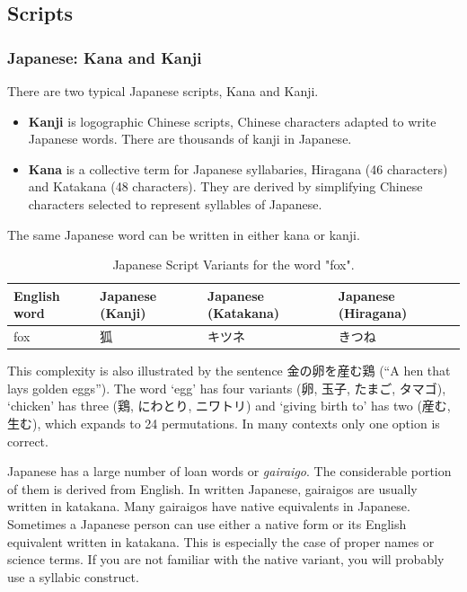 \documentclass[11pt]{article}
\begin{document}
\subsection{Scripts}
\subsubsection{Japanese: Kana and Kanji}
There are two typical Japanese scripts, Kana and Kanji.
\begin{itemize}
    \item \textbf{Kanji} is logographic Chinese scripts, Chinese characters adapted to write Japanese words. There are thousands of kanji in Japanese.
    \item \textbf{Kana} is a collective term for Japanese syllabaries, Hiragana (46 characters) and Katakana (48 characters). They are derived by simplifying Chinese characters selected to represent syllables of Japanese.
\end{itemize}

The same Japanese word can be written in either kana or kanji.

\begin{table}[h!]
    \centering
    \caption{Japanese Script Variants for the word "fox".}
    \begin{tabular}{llll}
    \toprule
    \textbf{English word} & \textbf{Japanese (Kanji)} & \textbf{Japanese (Katakana)} & \textbf{Japanese (Hiragana)} \\
    \midrule
    fox & 狐 & キツネ & きつね \\
    \bottomrule
    \end{tabular}
    \label{tab:fox_variants}
\end{table}

This complexity is also illustrated by the sentence 金の卵を産む鶏 (“A hen that lays golden eggs”). The word ‘egg’ has four variants (卵, 玉子, たまご, タマゴ), ‘chicken’ has three (鶏, にわとり, ニワトリ) and ‘giving birth to’ has two (産む, 生む), which expands to 24 permutations. In many contexts only one option is correct.

Japanese has a large number of loan words or \textit{gairaigo}. The considerable portion of them is derived from English. In written Japanese, gairaigos are usually written in katakana. Many gairaigos have native equivalents in Japanese. Sometimes a Japanese person can use either a native form or its English equivalent written in katakana. This is especially the case of proper names or science terms. If you are not familiar with the native variant, you will probably use a syllabic construct.
\end{document}

